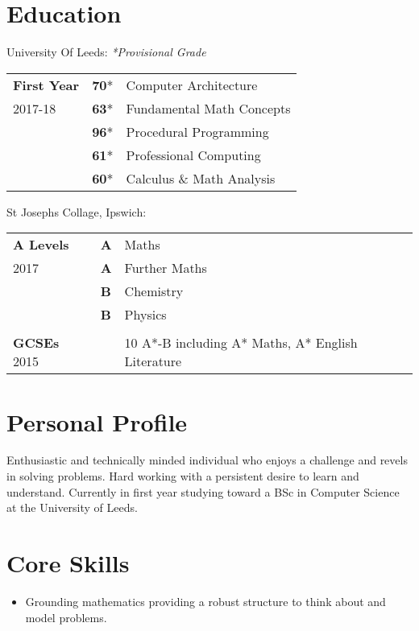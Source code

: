 \documentclass[9pt,a4paper]{article}
\begin{document}
\begin{multicols*}{2}
  \section*{Education}
  \vspace*{-.3cm}
  University Of Leeds:
  \newline\textit{*Provisional Grade}
  \vspace*{-6mm}
\begin{center}
  \begin{tabular}{p{2cm} p{0.6cm} p{5.4cm}}
    \textbf{First Year}&\textbf{70}*&Computer Architecture\\
	2017-18&\textbf{63}*&Fundamental Math Concepts\\
	    &\textbf{96}*&Procedural Programming\\
	    &\textbf{61}*&Professional Computing\\
	    &\textbf{60}*&Calculus \& Math Analysis\\
  \end{tabular}
\end{center}
  St Josephs Collage, Ipswich:
  \vspace*{-.6cm}
\begin{center}
  \begin{tabular}{p{2cm} p{0.6cm} p{5.4cm}}
    \textbf{A Levels}&\textbf{A}&Maths\\
	2017&\textbf{A}&Further Maths\\
	    &\textbf{B}&Chemistry\\
	    &\textbf{B}&Physics\\
\\
    \textbf{GCSEs}
        2015&& 10 A*-B including A* Maths, A* English Literature
  \end{tabular}
\end{center}


\section*{Personal Profile}
Enthusiastic and technically minded individual who enjoys a challenge and revels in solving problems.
Hard working with a persistent desire to learn and understand.
Currently in first year studying toward a BSc in Computer Science at the University of Leeds.

\section*{Core Skills}
\begin{itemize}
\item Grounding mathematics providing a robust structure to think about and model problems.


\end{itemize}
\end{multicols*}
\end{document}

